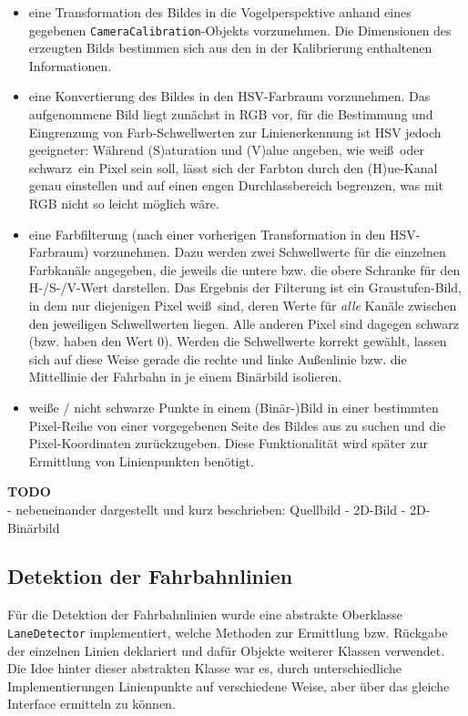 \begin{itemize}
	\item eine Transformation des Bildes in die Vogelperspektive anhand eines gegebenen
	\texttt{CameraCalibration}-Objekts vorzunehmen. Die Dimensionen des erzeugten Bilds bestimmen sich aus
	den in der Kalibrierung enthaltenen Informationen.
	\item eine Konvertierung des Bildes in den HSV-Farbraum vorzunehmen. Das aufgenommene Bild liegt
	zun\"achst in RGB vor, f\"ur die Bestimmung und Eingrenzung von Farb-Schwellwerten zur Linienerkennung
	ist HSV jedoch geeigneter: W\"ahrend (S)aturation und (V)alue angeben,
	wie \glqq wei\ss \grqq\ oder \glqq schwarz\grqq\ ein Pixel
	sein soll, l\"asst sich der Farbton durch den (H)ue-Kanal genau einstellen und auf einen engen
	Durchlassbereich begrenzen, was mit RGB nicht so leicht m\"oglich w\"are.
	\item eine Farbfilterung (nach einer vorherigen Transformation in den HSV-Farbraum) vorzunehmen. Dazu
	werden zwei Schwellwerte f\"ur die einzelnen Farbkan\"ale angegeben, die jeweils die untere bzw. die
	obere Schranke f\"ur den H-/S-/V-Wert darstellen. Das Ergebnis der Filterung ist ein Graustufen-Bild,
	in dem nur diejenigen Pixel wei\ss\ sind, deren Werte f\"ur \textit{alle} Kan\"ale zwischen den
	jeweiligen Schwellwerten liegen. Alle anderen Pixel sind dagegen schwarz (bzw. haben den Wert 0).
	Werden die Schwellwerte korrekt gew\"ahlt, lassen sich auf diese Weise gerade die rechte und linke
	Au\ss enlinie bzw. die Mittellinie der Fahrbahn in je einem Bin\"arbild isolieren.
	\item wei\ss e / nicht schwarze Punkte in einem (Bin\"ar-)Bild in einer bestimmten Pixel-Reihe
	von einer vorgegebenen Seite des Bildes aus zu suchen und die Pixel-Koordinaten zur\"uckzugeben.
	Diese Funktionalit\"at wird sp\"ater zur Ermittlung von Linienpunkten ben\"otigt.
\end{itemize} 

\textbf{TODO}\\
- nebeneinander dargestellt und kurz beschrieben: Quellbild - 2D-Bild - 2D-Bin\"arbild\\

\subsection{Detektion der Fahrbahnlinien}

F\"ur die Detektion der Fahrbahnlinien wurde eine abstrakte Oberklasse \texttt{LaneDetector} implementiert,
welche Methoden zur Ermittlung bzw. R\"uckgabe der einzelnen Linien deklariert und daf\"ur Objekte
weiterer Klassen verwendet. Die Idee hinter dieser
abstrakten Klasse war es, durch unterschiedliche Implementierungen Linienpunkte auf verschiedene Weise,
aber \"uber das gleiche Interface ermitteln zu k\"onnen.\\

